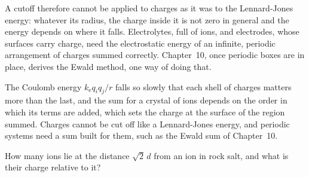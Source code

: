 A cutoff therefore cannot be applied to charges as it was to the
Lennard-Jones energy: whatever its radius, the charge inside it is not
zero in general and the energy depends on where it falls. Electrolytes,
full of ions, and electrodes, whose surfaces carry charge, need the
electrostatic energy of an infinite, periodic arrangement of charges
summed correctly. Chapter~10, once periodic boxes are in place, derives
the Ewald method, one way of doing that.

\begin{keyidea}
The Coulomb energy $k_{\mathrm e}q_iq_j/r$ falls so slowly that each shell of
charges matters more than the last, and the sum for a crystal of ions
depends on the order in which its terms are added, which sets the charge
at the surface of the region summed. Charges cannot be cut off like a
Lennard-Jones energy, and periodic systems need a sum built for them,
such as the Ewald sum of Chapter~10.
\end{keyidea}


\begin{selfcheck}
How many ions lie at the distance $\sqrt2\,d$ from an ion in rock salt,
and what is their charge relative to it?
\end{selfcheck}
